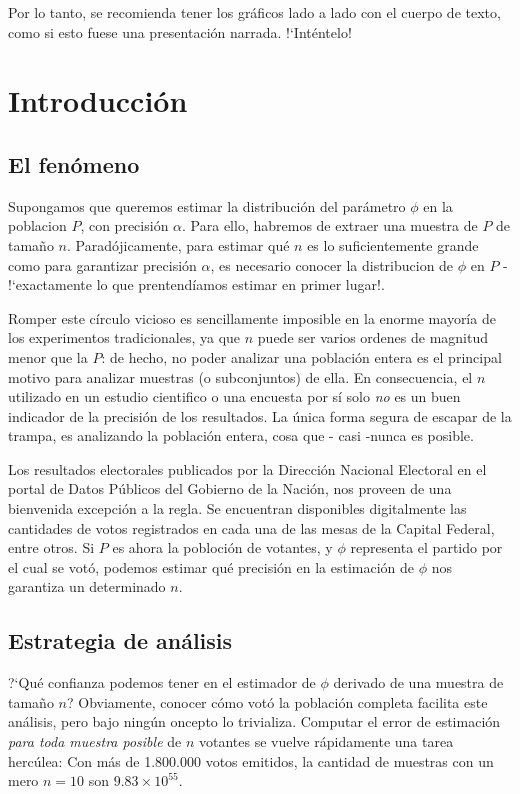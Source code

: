 \documentclass[12pt, a4paper]{article}
\begin{document}
Por lo tanto, se recomienda tener los gr\'aficos lado a lado con el cuerpo de texto, como si esto fuese una presentaci\'on narrada. !`Int\'entelo!

\pagebreak

\section{Introducci\'on}

\subsection{El fen\'omeno}

Supongamos que queremos estimar la distribuci\'on del par\'ametro $\phi$ en la poblacion $P$, con precisi\'on $\alpha$. Para ello, habremos de extraer una muestra de $P$ de tama\~no $n$. Parad\'ojicamente, para estimar qu\'e $n$ es lo suficientemente grande como para garantizar precisi\'on $\alpha$, es necesario conocer la distribucion de $\phi$ en $P$ - !`exactamente lo que prentend\'iamos estimar en primer lugar!.

Romper este c\'irculo vicioso es sencillamente imposible en la enorme mayor\'ia de los experimentos tradicionales, ya que $n$ puede ser varios ordenes de magnitud menor que la $P$: de hecho, no poder analizar una poblaci\'on entera es el principal motivo para analizar muestras (o subconjuntos) de ella. En consecuencia, el $n$ utilizado en un estudio cientifico o una encuesta por s\'i solo \emph{no} es un buen indicador de la precisi\'on de los resultados. La \'unica forma segura de escapar de la trampa, es analizando la poblaci\'on entera, cosa que - casi -nunca es posible.

Los resultados electorales publicados por la Direcci\'on Nacional Electoral en el portal de Datos P\'ublicos del Gobierno de la Naci\'on, nos proveen de una bienvenida excepci\'on a la regla. Se encuentran disponibles digitalmente las cantidades de votos registrados en cada una de las mesas de la Capital Federal, entre otros. Si $P$ es ahora la pobloci\'on de votantes, y $\phi$ representa el partido por el cual se vot\'o, podemos estimar qu\'e precisi\'on en la estimaci\'on de $\phi$ nos garantiza un determinado $n$.

\subsection{Estrategia de an\'alisis}
?`Qu\'e confianza podemos tener en el estimador de $\phi$ derivado de una muestra de tama\~no $n$? Obviamente, conocer c\'omo vot\'o la poblaci\'on completa facilita este an\'alisis, pero bajo ning\'un oncepto lo trivializa. Computar el error de estimaci\'on \emph{para toda muestra posible} de $n$ votantes se vuelve r\'apidamente una tarea herc\'ulea: Con m\'as de 1.800.000 votos emitidos, la cantidad de muestras con un mero $n=10$ son $9.83 \times 10^{55}$.
\end{document}
